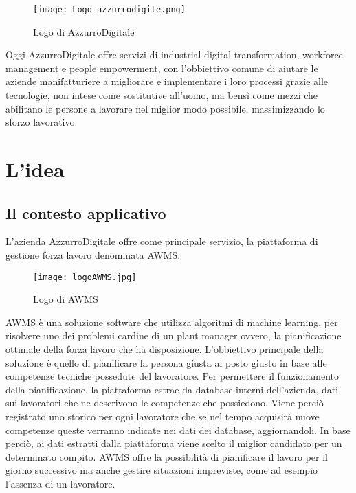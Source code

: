 \begin{figure}[htbp]
	\begin{center}
		\texttt{[image: Logo\_azzurrodigite.png]}
			\caption{Logo di AzzurroDigitale}
	\end{center}
\end{figure}

Oggi AzzurroDigitale offre servizi di industrial digital transformation, workforce management e people empowerment, con l'obbiettivo comune di aiutare le aziende manifatturiere a migliorare e implementare i loro processi grazie alle tecnologie, non intese come sostitutive all’uomo, ma bensì come mezzi che abilitano le persone a lavorare nel miglior modo possibile, massimizzando lo sforzo lavorativo.\\

\section{L'idea}

\subsection{Il contesto applicativo}
L'azienda AzzurroDigitale offre come principale servizio, la piattaforma di gestione forza lavoro denominata AWMS.\\
	\begin{figure}[!h] 
		\begin{center}
			\texttt{[image: logoAWMS.jpg]}
			\caption{Logo di AWMS}
		\end{center}
	\end{figure}

AWMS è una soluzione software che utilizza algoritmi di machine learning, per risolvere uno dei problemi cardine di un plant manager ovvero, la pianificazione ottimale della forza lavoro che ha disposizione. L'obbiettivo principale della soluzione è quello di pianificare la persona giusta al posto giusto in base alle competenze tecniche possedute del lavoratore. Per permettere il funzionamento della pianificazione, la piattaforma estrae da database interni dell'azienda, dati sui lavoratori che ne descrivono le competenze che possiedono. Viene perciò registrato uno storico per ogni lavoratore che se nel tempo acquisirà nuove competenze queste verranno indicate nei dati dei database, aggiornandoli. In base perciò, ai dati estratti dalla piattaforma viene scelto il miglior candidato per un determinato compito. AWMS offre la possibilità di pianificare il lavoro per il giorno successivo ma anche gestire situazioni impreviste, come ad esempio l'assenza di un lavoratore.

